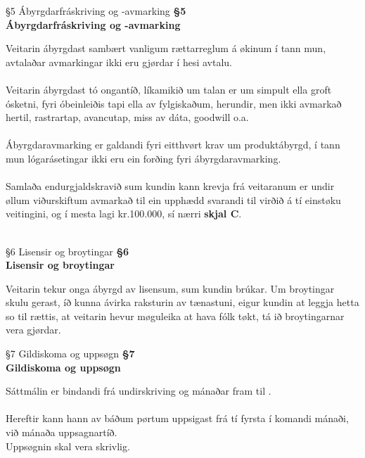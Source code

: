 \begin{center}
	 {§5 Ábyrgdarfráskriving og -avmarking}
	\textbf{§5 \\ Ábyrgdarfráskriving og -avmarking}
\end{center}
Veitarin ábyrgdast sambært vanligum rættarreglum á økinum í tann mun, avtalaðar avmarkingar ikki eru gjørdar í hesi avtalu. \\ \\
Veitarin ábyrgdast tó ongantíð, líkamikið um talan er um simpult ella groft ósketni, fyri óbeinleiðis tapi ella av fylgiskaðum, herundir, men ikki avmarkað hertil, rastrartap, avancutap, miss av dáta, goodwill o.a. \\ \\
Ábyrgdaravmarking er galdandi fyri eitthvørt krav um produktábyrgd, í tann mun lógarásetingar ikki eru ein forðing fyri ábyrgdaravmarking. \\ \\
Samlaða endurgjaldskravið sum kundin kann krevja frá veitaranum er undir øllum viðurskiftum avmarkað til ein upphædd svarandi til virðið á tí einstøku veitingini, og í mesta lagi kr.100.000, sí nærri \textbf{skjal C}. \\ \\

\begin{center}
	 {§6 Lisensir og broytingar}
	\textbf{§6 \\ Lisensir og broytingar}
\end{center}
Veitarin tekur onga ábyrgd av lisensum, sum kundin brúkar. Um broytingar skulu gerast, íð kunna ávirka raksturin av tænastuni, eigur kundin at leggja hetta so til rættis, at veitarin hevur møguleika at hava fólk tøkt, tá ið broytingarnar vera gjørdar.

\begin{center}
	 {§7 Gildiskoma og uppsøgn}
	\textbf{§7 \\ Gildiskoma og uppsøgn}
\end{center}
Sáttmálin er bindandi frá undirskriving og \bindingsperiodeA mánaðar fram til \datoBindingA. \\ \\
Hereftir kann hann av báðum pørtum uppsigast frá tí fyrsta í komandi mánaði, við \bindingsperiodeB mánaða uppsagnartíð. \\ 
Uppsøgnin skal vera skrivlig.

